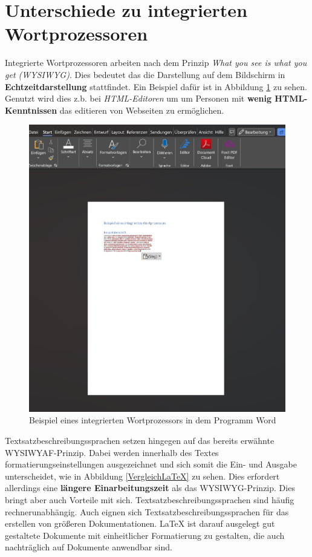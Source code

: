 \section{Unterschiede zu integrierten Wortprozessoren}
Integrierte Wortprozessoren arbeiten nach dem Prinzip \textit{What you see is what you get (WYSIWYG)}. Dies bedeutet das die Darstellung auf dem Bildschirm in \textbf{Echtzeitdarstellung} stattfindet. Ein Beispiel dafür ist in Abbildung \ref{Wortprozessor} zu sehen. Genutzt wird dies z.b. bei \textit{HTML-Editoren} um um Personen mit \textbf{wenig HTML-Kenntnissen} das editieren von Webseiten zu ermöglichen.

\begin{figure}[h]
	\centering
	\includegraphics[scale=0.5]{Images/Wortprozessor.png}
	\caption{Beispiel eines integrierten Wortprozessors in dem Programm Word}
	\label{Wortprozessor}
\end{figure}

Textsatzbeschreibungssprachen setzen hingegen auf das bereits erwähnte WYSIWYAF-Prinzip. Dabei werden innerhalb des Textes formatierungseinstellungen ausgezeichnet und sich somit die Ein- und Ausgabe unterscheidet, wie in Abbildung \ref{VergleichLaTeX} zu sehen. Dies erfordert allerdings eine \textbf{längere Einarbeitungszeit} als das WYSIWYG-Prinzip.
Dies bringt aber auch Vorteile mit sich. Textsatzbeschreibungssprachen sind häufig rechnerunabhängig. Auch eignen sich Textsatzbeschreibungssprachen für das erstellen von größeren Dokumentationen. LaTeX ist darauf ausgelegt gut gestaltete Dokumente mit einheitlicher Formatierung zu gestalten, die auch nachträglich auf Dokumente anwendbar sind. 

